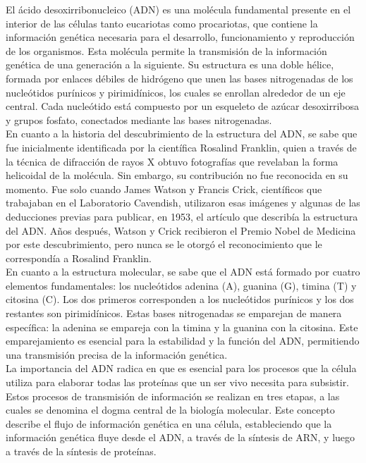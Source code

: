 
El ácido desoxirribonucleico (ADN) es una molécula fundamental presente en el interior de las células tanto eucariotas como procariotas, que contiene la información genética necesaria para el desarrollo, funcionamiento y reproducción de los organismos. Esta molécula permite la transmisión de la información genética de una generación a la siguiente. Su estructura es una doble hélice, formada por enlaces débiles de hidrógeno que unen las bases nitrogenadas de los nucleótidos purínicos y pirimidínicos, los cuales se enrollan alrededor de un eje central. Cada nucleótido está compuesto por un esqueleto de azúcar desoxirribosa y grupos fosfato, conectados mediante las bases nitrogenadas.\\

En cuanto a la historia del descubrimiento de la estructura del ADN, se sabe que fue inicialmente identificada por la científica Rosalind Franklin, quien a través de la técnica de difracción de rayos X obtuvo fotografías que revelaban la forma helicoidal de la molécula. Sin embargo, su contribución no fue reconocida en su momento. Fue solo cuando James Watson y Francis Crick, científicos que trabajaban en el Laboratorio Cavendish, utilizaron esas imágenes y algunas de las deducciones previas para publicar, en 1953, el artículo que describía la estructura del ADN. Años después, Watson y Crick recibieron el Premio Nobel de Medicina por este descubrimiento, pero nunca se le otorgó el reconocimiento que le correspondía a Rosalind Franklin.\\

En cuanto a la estructura molecular, se sabe que el ADN está formado por cuatro elementos fundamentales: los nucleótidos adenina (A), guanina (G), timina (T) y citosina (C). Los dos primeros corresponden a los nucleótidos purínicos y los dos restantes son pirimidínicos. Estas bases nitrogenadas se emparejan de manera específica: la adenina se empareja con la timina y la guanina con la citosina. Este emparejamiento es esencial para la estabilidad y la función del ADN, permitiendo una transmisión precisa de la información genética.\\

La importancia del ADN radica en que es esencial para los procesos que la célula utiliza para elaborar todas las proteínas que un ser vivo necesita para subsistir. Estos procesos de transmisión de información se realizan en tres etapas, a las cuales se denomina el dogma central de la biología molecular. Este concepto describe el flujo de información genética en una célula, estableciendo que la información genética fluye desde el ADN, a través de la síntesis de ARN, y luego a través de la síntesis de proteínas.\\

